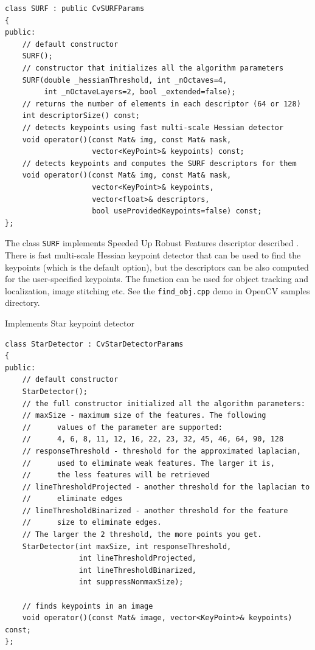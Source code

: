 \begin{lstlisting}
class SURF : public CvSURFParams
{
public:
    // default constructor
    SURF();
    // constructor that initializes all the algorithm parameters
    SURF(double _hessianThreshold, int _nOctaves=4,
         int _nOctaveLayers=2, bool _extended=false);
    // returns the number of elements in each descriptor (64 or 128)
    int descriptorSize() const;
    // detects keypoints using fast multi-scale Hessian detector
    void operator()(const Mat& img, const Mat& mask,
                    vector<KeyPoint>& keypoints) const;
    // detects keypoints and computes the SURF descriptors for them
    void operator()(const Mat& img, const Mat& mask,
                    vector<KeyPoint>& keypoints,
                    vector<float>& descriptors,
                    bool useProvidedKeypoints=false) const;
};
\end{lstlisting}

The class \texttt{SURF} implements Speeded Up Robust Features descriptor described \cite{Bay06}.
There is fast multi-scale Hessian keypoint detector that can be used to find the keypoints
(which is the default option), but the descriptors can be also computed for the user-specified keypoints.
The function can be used for object tracking and localization, image stitching etc. See the
\texttt{find\_obj.cpp} demo in OpenCV samples directory.


\label{StarDetector}
Implements Star keypoint detector

\begin{lstlisting}
class StarDetector : CvStarDetectorParams
{
public:
    // default constructor
    StarDetector();
    // the full constructor initialized all the algorithm parameters:
    // maxSize - maximum size of the features. The following 
    //      values of the parameter are supported:
    //      4, 6, 8, 11, 12, 16, 22, 23, 32, 45, 46, 64, 90, 128
    // responseThreshold - threshold for the approximated laplacian,
    //      used to eliminate weak features. The larger it is,
    //      the less features will be retrieved
    // lineThresholdProjected - another threshold for the laplacian to 
    //      eliminate edges
    // lineThresholdBinarized - another threshold for the feature 
    //      size to eliminate edges.
    // The larger the 2 threshold, the more points you get.
    StarDetector(int maxSize, int responseThreshold,
                 int lineThresholdProjected,
                 int lineThresholdBinarized,
                 int suppressNonmaxSize);

    // finds keypoints in an image
    void operator()(const Mat& image, vector<KeyPoint>& keypoints) const;
};
\end{lstlisting}

